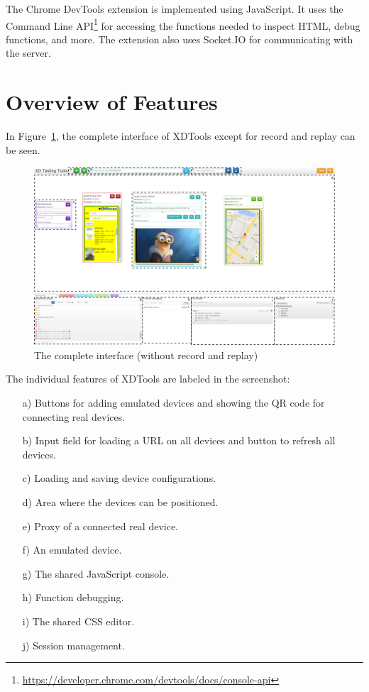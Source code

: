 The Chrome DevTools extension is implemented using JavaScript. It uses the Command Line API\footnote{\url{https://developer.chrome.com/devtools/docs/console-api}} for accessing the functions needed to inspect HTML, debug functions, and more. The extension also uses Socket.IO for  communicating with the server. 

\section{Overview of Features}

In Figure~\ref{fig:complete}, the complete interface of XDTools except for record and replay can be seen.

\begin{figure}[H]
  \centering
    \includegraphics[width=1.0\textwidth]{images/screenshots/complete_labeled.png}
	\caption[Screenshot: Complete Interface]{The complete interface (without record and replay)}
	\label{fig:complete}
\end{figure}

The individual features of XDTools are labeled in the screenshot:
\begin{itemize}
	\item [a)] Buttons for adding emulated devices and showing the QR code for connecting real devices.
	\item [b)] Input field for loading a URL on all devices and button to refresh all devices.
	\item [c)] Loading and saving device configurations.
	\item [d)] Area where the devices can be positioned.
	\item [e)] Proxy of a connected real device.
	\item [f)] An emulated device.
	\item [g)] The shared JavaScript console.
	\item [h)] Function debugging.
	\item [i)] The shared CSS editor.
	\item [j)] Session management.
\end{itemize}

